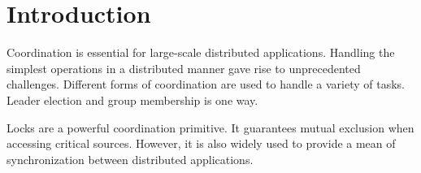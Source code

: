 \section{Introduction}\label{sec:intro}

Coordination is essential for large-scale distributed applications. Handling the simplest operations in a distributed manner gave rise to unprecedented challenges. Different forms of coordination are used to handle a variety of tasks. Leader election and group membership is one way. 

Locks are a powerful coordination primitive. It guarantees mutual exclusion when accessing critical sources. However, it is also widely used to provide a mean of synchronization between distributed applications. 

